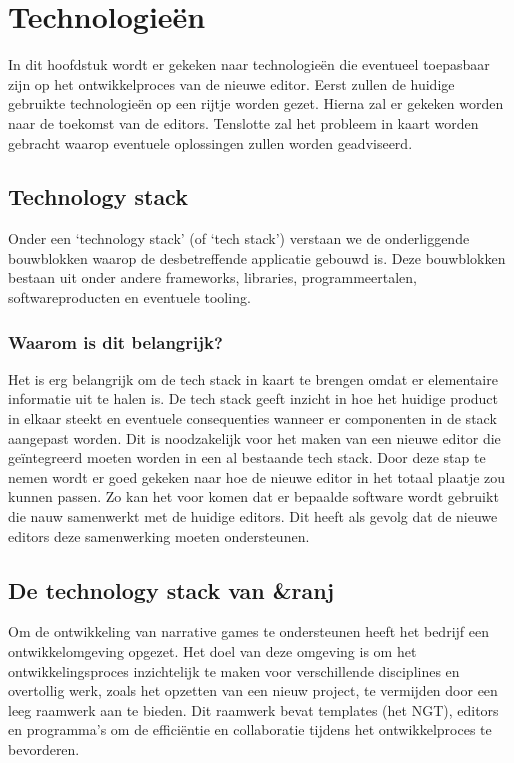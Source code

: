 \chapter{Technologieën}
\label{ch:technologystack}
In dit hoofdstuk wordt er gekeken naar technologieën die eventueel toepasbaar zijn op het ontwikkelproces van de nieuwe editor. Eerst zullen de huidige gebruikte technologieën op een rijtje worden gezet. Hierna zal er gekeken worden naar de toekomst van de editors. Tenslotte zal het probleem in kaart worden gebracht waarop eventuele oplossingen zullen worden geadviseerd.

\section{Technology stack}
Onder een ‘technology stack’ (of ‘tech stack’) verstaan we de onderliggende bouwblokken waarop de desbetreffende applicatie gebouwd is. Deze bouwblokken bestaan uit onder andere frameworks, libraries, programmeertalen, softwareproducten en eventuele tooling\cite{BlogTechStack}.

\subsection{Waarom is dit belangrijk?}
Het is erg belangrijk om de tech stack in kaart te brengen omdat er elementaire informatie uit te halen is. De tech stack geeft inzicht in hoe het huidige product in elkaar steekt en eventuele consequenties wanneer er componenten in de stack aangepast worden. Dit is noodzakelijk voor het maken van een nieuwe editor die geïntegreerd moeten worden in een al bestaande tech stack. Door deze stap te nemen wordt er goed gekeken naar hoe de nieuwe editor in het totaal plaatje zou kunnen passen. Zo kan het voor komen dat er bepaalde software wordt gebruikt die nauw samenwerkt met de huidige editors. Dit heeft als gevolg dat de nieuwe editors deze samenwerking moeten ondersteunen.

\pagebreak
\section{De technology stack van \&ranj}
Om de ontwikkeling van narrative games te ondersteunen heeft het bedrijf een ontwikkelomgeving opgezet. Het doel van deze omgeving is om het ontwikkelingsproces inzichtelijk te maken voor verschillende disciplines en overtollig werk, zoals het opzetten van een nieuw project, te vermijden door een leeg raamwerk aan te bieden. Dit raamwerk bevat templates (het NGT), editors en programma’s om de efficiëntie en collaboratie tijdens het ontwikkelproces te bevorderen.

